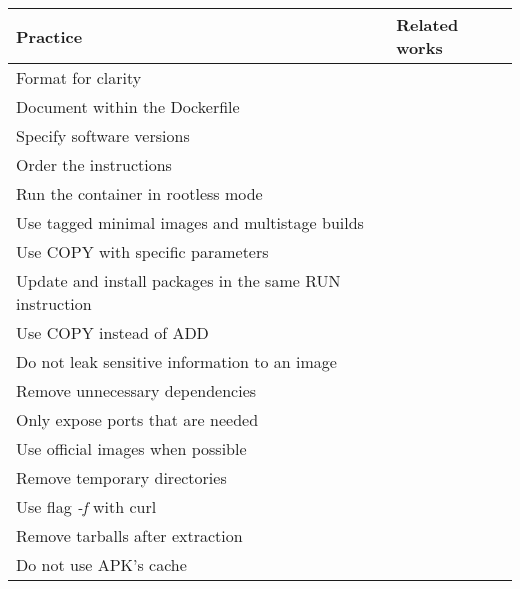 \begin{table}[H]
    \centering
    \begin{tabular}{|p{}|p{}|}
        \hline \textbf{Practice} & \textbf{Related works} \\
        \hline Format for clarity & \cite{nustTenSimpleRules2020} \\
        \hline Document within the Dockerfile & \cite{nustTenSimpleRules2020} \\
        \hline Specify software versions & \cite{nustTenSimpleRules2020} \\
        \hline Order the instructions & \cite{nustTenSimpleRules2020} \\
        \hline Run the container in rootless mode & \cite{prinettoSecurityMisconfigurationsDetection} \\
        \hline Use tagged minimal images and multistage builds & \cite{prinettoSecurityMisconfigurationsDetection} \\
        \hline Use COPY with specific parameters & \cite{prinettoSecurityMisconfigurationsDetection} \\
        \hline Update and install packages in the same RUN instruction & \cite{prinettoSecurityMisconfigurationsDetection} \\
        \hline Use COPY instead of ADD & \cite{prinettoSecurityMisconfigurationsDetection} \\
        \hline Do not leak sensitive information to an image & \cite{prinettoSecurityMisconfigurationsDetection} \\
        \hline Remove unnecessary dependencies & \cite{prinettoSecurityMisconfigurationsDetection} \\
        \hline Only expose ports that are needed & \cite{prinettoSecurityMisconfigurationsDetection} \\
        \hline Use official images when possible & \cite{prinettoSecurityMisconfigurationsDetection} \\
        \hline Remove temporary directories & \cite{henkelLearningUnderstandingSupporting2020} \\
        \hline Use flag \textit{-f} with curl & \cite{henkelLearningUnderstandingSupporting2020} \\
        \hline Remove tarballs after extraction & \cite{henkelLearningUnderstandingSupporting2020} \\
        \hline Do not use APK's cache & \cite{henkelLearningUnderstandingSupporting2020} \\

\end{tabular}
\end{table}
